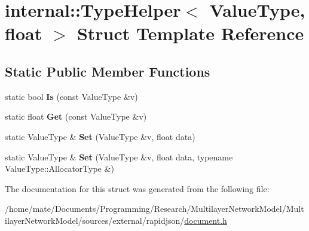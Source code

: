 \hypertarget{structinternal_1_1TypeHelper_3_01ValueType_00_01float_01_4}{}\section{internal\+:\+:Type\+Helper$<$ Value\+Type, float $>$ Struct Template Reference}
\label{structinternal_1_1TypeHelper_3_01ValueType_00_01float_01_4}
\subsection*{Static Public Member Functions}
\begin{DoxyCompactItemize}
\item 
static bool {\bfseries Is} (const Value\+Type \&v)\hypertarget{structinternal_1_1TypeHelper_3_01ValueType_00_01float_01_4_a1108488a02868bb91c3c14f4598bbebc}{}\label{structinternal_1_1TypeHelper_3_01ValueType_00_01float_01_4_a1108488a02868bb91c3c14f4598bbebc}

\item 
static float {\bfseries Get} (const Value\+Type \&v)\hypertarget{structinternal_1_1TypeHelper_3_01ValueType_00_01float_01_4_aa681e0d25878a7a770b0be82322b435a}{}\label{structinternal_1_1TypeHelper_3_01ValueType_00_01float_01_4_aa681e0d25878a7a770b0be82322b435a}

\item 
static Value\+Type \& {\bfseries Set} (Value\+Type \&v, float data)\hypertarget{structinternal_1_1TypeHelper_3_01ValueType_00_01float_01_4_a28318c2063421cf18dfa23d16352a3b8}{}\label{structinternal_1_1TypeHelper_3_01ValueType_00_01float_01_4_a28318c2063421cf18dfa23d16352a3b8}

\item 
static Value\+Type \& {\bfseries Set} (Value\+Type \&v, float data, typename Value\+Type\+::\+Allocator\+Type \&)\hypertarget{structinternal_1_1TypeHelper_3_01ValueType_00_01float_01_4_a3a0d8783f6228504058c427a16687bdf}{}\label{structinternal_1_1TypeHelper_3_01ValueType_00_01float_01_4_a3a0d8783f6228504058c427a16687bdf}

\end{DoxyCompactItemize}


The documentation for this struct was generated from the following file\+:\begin{DoxyCompactItemize}
\item 
/home/mate/\+Documents/\+Programming/\+Research/\+Multilayer\+Network\+Model/\+Multilayer\+Network\+Model/sources/external/rapidjson/\hyperlink{document_8h}{document.\+h}\end{DoxyCompactItemize}
